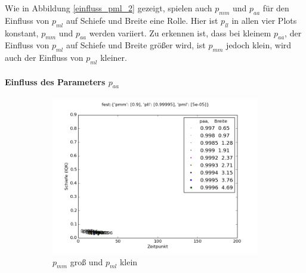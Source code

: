 Wie in Abbildung \ref{einfluss_pml_2} gezeigt, spielen auch $p_{mm}$ und $p_{aa}$ für den Einfluss von $p_{ml}$ auf Schiefe und Breite eine Rolle. Hier ist $p_{ll}$ in allen vier Plots konstant, $p_{mm}$ und $p_{aa}$ werden variiert. Zu erkennen ist, dass bei kleinem $p_{aa}$, der Einfluss von $p_{ml}$ auf Schiefe und Breite größer wird, ist $p_{mm}$ jedoch klein, wird auch der Einfluss von $p_{ml}$ kleiner.


\paragraph*{Einfluss des Parameters $p_{aa}$}

\begin{figure}
\begin{subfigure}[t]{0.49\textwidth}
\includegraphics[width=\textwidth]{bilder/paa/3fest_09_5e-05_p_099995}
\caption{$p_{mm}$ groß und $p_{ml}$ klein}
\end{subfigure}
\begin{subfigure}[t]{0.49\textwidth}

\end{subfigure}
\end{figure}
